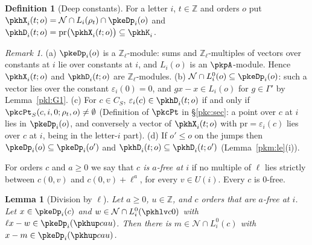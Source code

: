 \documentclass[10pt]{amsart}
\newtheorem{lemma}[theorem]{Lemma}
\theoremstyle{definition}
\newtheorem{definition}[theorem]{Definition}
\theoremstyle{remark}
\newtheorem{remark}[theorem]{Remark}
\newcommand{\Z}{\mathbb Z}
\begin{document}
\begin{definition}[Deep constants]\label{pkh:def-D}
For a letter $i$, $t\in\Z$ and orders $o$ put $\pkhX_i(t;o)=\mathcal N\cap L_i(\rho_t)\cap\pkeDp_i(o)$ and
$\pkhD_i(t;o)=\mathrm{pr}\bigl(\pkhX_i(t;o)\bigr)\subseteq\pkhK_i$.
\end{definition}

\begin{remark}\label{pkh:rem-D}
(a) $\pkeDp_i(o)$ is a $\Z_\ell$-module: sums and $\Z_\ell$-multiples of vectors over constants at $i$ lie over
constants at $i$, and $L_i(o)$ is an $\pkpA$-module. Hence $\pkhX_i(t;o)$ and $\pkhD_i(t;o)$ are
$\Z_\ell$-modules. (b) $\mathcal N\cap L^0_i(o)\subseteq\pkeDp_i(o)$: such a vector lies over the constant
$\varepsilon_i(0)=0$, and $gx-x\in L_i(o)$ for $g\in\Gamma'$ by Lemma~\ref{pkl:G1}. (c) For $c\in C_S$,
$\varepsilon_i(c)\in\pkhD_i(t;o)$ if and only if $\pkcPt_S(c,i,0;\rho_t,o)\ne\emptyset$ (Definition of
$\pkcPt$ in \S\ref{pkc:sec}: a point over $c$ at $i$ lies in $\pkeDp_i(o)$, and conversely a vector of
$\pkhX_i(t;o)$ with $\mathrm{pr}=\varepsilon_i(c)$ lies over $c$ at $i$, being in the letter-$i$ part). (d) If
$o'\le o$ on the jumps then $\pkeDp_i(o)\subseteq\pkeDp_i(o')$ and $\pkhD_i(t;o)\subseteq\pkhD_i(t;o')$
(Lemma~\ref{pkm:le}(i)).
\end{remark}

For orders $c$ and $a\ge0$ we say that \emph{$c$ is $a$-free at $i$} if no multiple of $\ell$ lies strictly
between $c(0,v)$ and $c(0,v)+\ell^a$, for every $v\in U(i)$. Every $c$ is $0$-free.

\begin{lemma}[Division by $\ell$]\label{pkh:div}
Let $a\ge0$, $u\in\Z$, and $c$ orders that are $a$-free at $i$. Let $x\in\pkeDp_i(c)$ and $w\in\mathcal N\cap
L^0_i(\pkhlv c0)$ with $\ell x-w\in\pkeDp_i(\pkhup cau)$. Then there is $m\in\mathcal N\cap L^0_i(c)$ with
$x-m\in\pkeDp_i(\pkhup cau)$.
\end{lemma}
\end{document}
